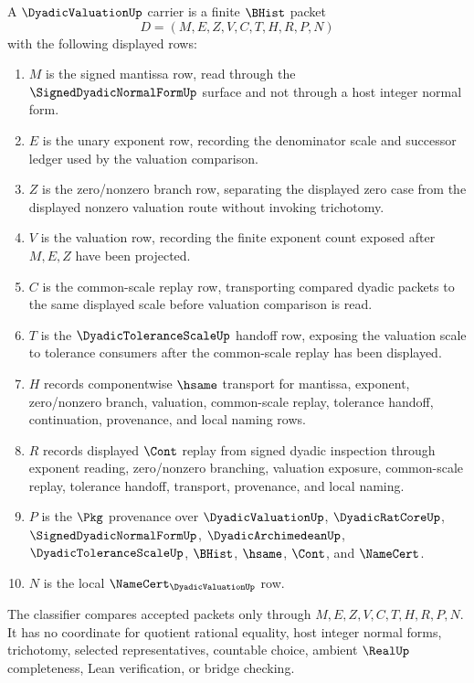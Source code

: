 \begin{definition}
\label{def:dyadic-valuation-carrier}
A $\DyadicValuationUp$ carrier is a finite $\BHist$ packet
$$
D=(M,E,Z,V,C,T,H,R,P,N)
$$
with the following displayed rows:
\begin{enumerate}
\item $M$ is the signed mantissa row, read through the $\SignedDyadicNormalFormUp$ surface and not through a host integer normal form.
\item $E$ is the unary exponent row, recording the denominator scale and successor ledger used by the valuation comparison.
\item $Z$ is the zero/nonzero branch row, separating the displayed zero case from the displayed nonzero valuation route without invoking trichotomy.
\item $V$ is the valuation row, recording the finite exponent count exposed after $M,E,Z$ have been projected.
\item $C$ is the common-scale replay row, transporting compared dyadic packets to the same displayed scale before valuation comparison is read.
\item $T$ is the $\DyadicToleranceScaleUp$ handoff row, exposing the valuation scale to tolerance consumers after the common-scale replay has been displayed.
\item $H$ records componentwise $\hsame$ transport for mantissa, exponent, zero/nonzero branch, valuation, common-scale replay, tolerance handoff, continuation, provenance, and local naming rows.
\item $R$ records displayed $\Cont$ replay from signed dyadic inspection through exponent reading, zero/nonzero branching, valuation exposure, common-scale replay, tolerance handoff, transport, provenance, and local naming.
\item $P$ is the $\Pkg$ provenance over $\DyadicValuationUp$, $\DyadicRatCoreUp$, $\SignedDyadicNormalFormUp$, $\DyadicArchimedeanUp$, $\DyadicToleranceScaleUp$, $\BHist$, $\hsame$, $\Cont$, and $\NameCert$.
\item $N$ is the local $\NameCert_{\DyadicValuationUp}$ row.
\end{enumerate}
The classifier compares accepted packets only through $M,E,Z,V,C,T,H,R,P,N$. It has no coordinate for quotient rational equality, host integer normal forms, trichotomy, selected representatives, countable choice, ambient $\RealUp$ completeness, Lean verification, or bridge checking.
\end{definition}

